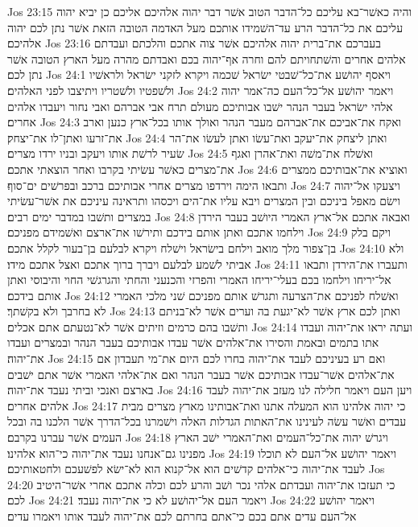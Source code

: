 Jos 23:15  והיה כאשׁר־בא עליכם כל־הדבר הטוב אשׁר דבר יהוה אלהיכם אליכם כן יביא יהוה עליכם את כל־הדבר הרע עד־השׁמידו אותכם מעל האדמה הטובה הזאת אשׁר נתן לכם יהוה אלהיכם׃
Jos 23:16  בעברכם את־ברית יהוה אלהיכם אשׁר צוה אתכם והלכתם ועבדתם אלהים אחרים והשׁתחויתם להם וחרה אף־יהוה בכם ואבדתם מהרה מעל הארץ הטובה אשׁר נתן לכם׃
Jos 24:1  ויאסף יהושׁע את־כל־שׁבטי ישׂראל שׁכמה ויקרא לזקני ישׂראל ולראשׁיו ולשׁפטיו ולשׁטריו ויתיצבו לפני האלהים׃
Jos 24:2  ויאמר יהושׁע אל־כל־העם כה־אמר יהוה אלהי ישׂראל בעבר הנהר ישׁבו אבותיכם מעולם תרח אבי אברהם ואבי נחור ויעבדו אלהים אחרים׃
Jos 24:3  ואקח את־אביכם את־אברהם מעבר הנהר ואולך אותו בכל־ארץ כנען וארב את־זרעו ואתן־לו את־יצחק׃
Jos 24:4  ואתן ליצחק את־יעקב ואת־עשׂו ואתן לעשׂו את־הר שׂעיר לרשׁת אותו ויעקב ובניו ירדו מצרים׃
Jos 24:5  ואשׁלח את־משׁה ואת־אהרן ואגף את־מצרים כאשׁר עשׂיתי בקרבו ואחר הוצאתי אתכם׃
Jos 24:6  ואוציא את־אבותיכם ממצרים ותבאו הימה וירדפו מצרים אחרי אבותיכם ברכב ובפרשׁים ים־סוף׃
Jos 24:7  ויצעקו אל־יהוה וישׂם מאפל ביניכם ובין המצרים ויבא עליו את־הים ויכסהו ותראינה עיניכם את אשׁר־עשׂיתי במצרים ותשׁבו במדבר ימים רבים׃
Jos 24:8  ואבאה אתכם אל־ארץ האמרי היושׁב בעבר הירדן וילחמו אתכם ואתן אותם בידכם ותירשׁו את־ארצם ואשׁמידם מפניכם׃
Jos 24:9  ויקם בלק בן־צפור מלך מואב וילחם בישׂראל וישׁלח ויקרא לבלעם בן־בעור לקלל אתכם׃
Jos 24:10  ולא אביתי לשׁמע לבלעם ויברך ברוך אתכם ואצל אתכם מידו׃
Jos 24:11  ותעברו את־הירדן ותבאו אל־יריחו וילחמו בכם בעלי־יריחו האמרי והפרזי והכנעני והחתי והגרגשׁי החוי והיבוסי ואתן אותם בידכם׃
Jos 24:12  ואשׁלח לפניכם את־הצרעה ותגרשׁ אותם מפניכם שׁני מלכי האמרי לא בחרבך ולא בקשׁתך׃
Jos 24:13  ואתן לכם ארץ אשׁר לא־יגעת בה וערים אשׁר לא־בניתם ותשׁבו בהם כרמים וזיתים אשׁר לא־נטעתם אתם אכלים׃
Jos 24:14  ועתה יראו את־יהוה ועבדו אתו בתמים ובאמת והסירו את־אלהים אשׁר עבדו אבותיכם בעבר הנהר ובמצרים ועבדו את־יהוה׃
Jos 24:15  ואם רע בעיניכם לעבד את־יהוה בחרו לכם היום את־מי תעבדון אם את־אלהים אשׁר־עבדו אבותיכם אשׁר בעבר הנהר ואם את־אלהי האמרי אשׁר אתם ישׁבים בארצם ואנכי וביתי נעבד את־יהוה׃
Jos 24:16  ויען העם ויאמר חלילה לנו מעזב את־יהוה לעבד אלהים אחרים׃
Jos 24:17  כי יהוה אלהינו הוא המעלה אתנו ואת־אבותינו מארץ מצרים מבית עבדים ואשׁר עשׂה לעינינו את־האתות הגדלות האלה וישׁמרנו בכל־הדרך אשׁר הלכנו בה ובכל העמים אשׁר עברנו בקרבם׃
Jos 24:18  ויגרשׁ יהוה את־כל־העמים ואת־האמרי ישׁב הארץ מפנינו גם־אנחנו נעבד את־יהוה כי־הוא אלהינו׃
Jos 24:19  ויאמר יהושׁע אל־העם לא תוכלו לעבד את־יהוה כי־אלהים קדשׁים הוא אל־קנוא הוא לא־ישׂא לפשׁעכם ולחטאותיכם׃
Jos 24:20  כי תעזבו את־יהוה ועבדתם אלהי נכר ושׁב והרע לכם וכלה אתכם אחרי אשׁר־היטיב לכם׃
Jos 24:21  ויאמר העם אל־יהושׁע לא כי את־יהוה נעבד׃
Jos 24:22  ויאמר יהושׁע אל־העם עדים אתם בכם כי־אתם בחרתם לכם את־יהוה לעבד אותו ויאמרו עדים׃
